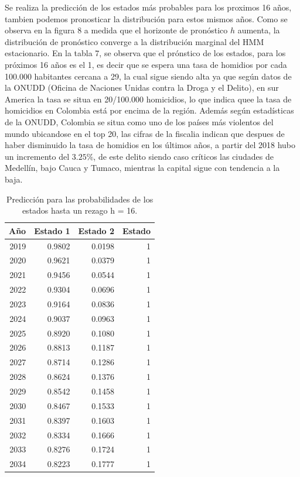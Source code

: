 \documentclass[a4paper]{article}\usepackage[]{graphicx}\usepackage[]{color}
\begin{document}
Se realiza la predicción de los estados más probables para los proximos 16 años, tambien podemos pronosticar la distribución para estos mismos años. Como se observa en la figura 8 a medida que el horizonte de pronóstico $h$ aumenta, la distribución de pronóstico converge a la distribución marginal del HMM estacionario. En la tabla 7, se observa que el prónstico de los estados, para los próximos 16 años es el 1, es decir que se espera una tasa de homidios por cada 100.000 habitantes cercana a 29, la cual sigue siendo alta ya que según datos de la ONUDD (Oficina de Naciones Unidas contra la Droga y el Delito), en sur America la tasa se situa en 20/100.000 homicidios, lo que indica quee la tasa de homicidios en  Colombia está por encima de la región. Además según estadísticas de la ONUDD, Colombia se situa como uno de los países más violentos del mundo ubicandose en el top 20, las cifras de la fiscalia indican que despues de haber disminuido la tasa de homidios en los últimos años, a partir del 2018 hubo un incremento del $3.25 \%$, de este delito siendo caso críticos las ciudades de Medellín, bajo Cauca y Tumaco, mientras la capital sigue con tendencia a la baja.

\begin{table}[ht]
\centering
\begin{tabular}{rrrr}
  \hline
Año & Estado 1 & Estado 2 & Estado \\ 
  \hline
 2019 & 0.9802 & 0.0198 &     1 \\ 
   2020 & 0.9621 & 0.0379 &     1 \\ 
   2021 & 0.9456 & 0.0544 &     1 \\ 
   2022 & 0.9304 & 0.0696 &     1 \\ 
   2023 & 0.9164 & 0.0836 &     1 \\ 
   2024 & 0.9037 & 0.0963 &     1 \\ 
   2025 & 0.8920 & 0.1080 &     1 \\ 
   2026 & 0.8813 & 0.1187 &     1 \\ 
   2027 & 0.8714 & 0.1286 &     1 \\ 
   2028 & 0.8624 & 0.1376 &     1 \\ 
   2029 & 0.8542 & 0.1458 &     1 \\ 
   2030 & 0.8467 & 0.1533 &     1 \\ 
   2031 & 0.8397 & 0.1603 &     1 \\ 
   2032 & 0.8334 & 0.1666 &     1 \\ 
   2033 & 0.8276 & 0.1724 &     1 \\ 
   2034 & 0.8223 & 0.1777 &     1 \\ 
   \hline
\end{tabular}
\caption{Predicción para las probabilidades de los estados hasta un rezago h = 16.} 
\end{table}
\end{document}

